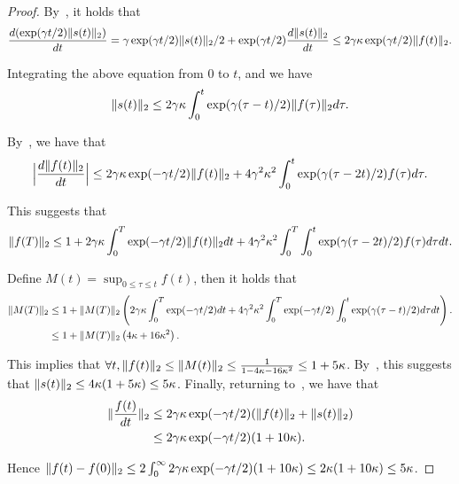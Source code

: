 \begin{proof}
By~, it holds that
\begin{align*}
    \frac{d (\exp(\gamma t /2)\| s(t)\|_2)}{dt} = \gamma \exp(\gamma t / 2) \| s(t)\|_2 / 2 + \exp(\gamma t / 2) \frac{d \| s(t)\|_2}{dt} \le 2\gamma \kappa  \exp(\gamma t / 2) \| f(t) \|_2.
\end{align*}

Integrating the above equation from $0$ to $t$, and we have 
\begin{align}
\label{eq:connectsf}
    \| s(t) \|_2 \le 2\gamma \kappa \int_{0}^{t}  \exp(\gamma (\tau - t) / 2) \| f(\tau) \|_2 d \tau.
\end{align}

By~, we have that
\begin{align*}
     \Big | \frac{d\| f(t) \|_2}{dt} \Big |   \le 2 \gamma \kappa  \exp(-\gamma t /2)  \|f(t)\|_2 +  4\gamma^2 \kappa^2 \int_{0}^{t}  \exp(\gamma (\tau - 2t)/ 2) f(\tau) d \tau.
\end{align*}

This suggests that
\begin{align*}
    \|f(T)\|_2 \le 1 + 2 \gamma \kappa \int_{0}^T  \exp(-\gamma t /2)  \|f(t)\|_2 dt  +  4\gamma^2 \kappa^2 \int_{0}^T \int_{0}^{t}  \exp(\gamma (\tau - 2t) / 2) f(\tau) d \tau dt.
\end{align*}

Define $M(t) = \sup_{0 \le \tau \le t} f(t)$, then it holds that
\begin{align*}
    \| M(T) \|_2 &\le 1 + \| M(T) \|_2 \left(2 \gamma \kappa \int_{0}^T  \exp(-\gamma t /2) dt +  4\gamma^2 \kappa^2 \int_{0}^T \exp(-\gamma t/2)  \int_{0}^{t}  \exp(\gamma  (\tau - t)/ 2)  d \tau dt \right). \\
    &\le 1 +  \| M(T) \|_2 \left( 4 \kappa + 16 \kappa^2 \right).
\end{align*}

This implies that $\forall t, \|f(t)\|_2 \le \| M(t) \|_2 \le \frac{1}{ 1- 4 \kappa - 16 \kappa^2} \le 1 + 5 \kappa$. By~, this suggests that $\| s(t)\|_2 \le 4 \kappa ( 1 + 5 \kappa) \le 5 \kappa$. Finally, returning to~, we have that
\begin{align*}
     \| \frac{f(t)}{dt} \|_2 &\le  2 \gamma \kappa  \exp(-\gamma t /2)  (\|f(t)\|_2 + \| s(t)\|_2) \\
     &\le  2 \gamma \kappa  \exp(-\gamma t /2)  (1 + 10 \kappa).
\end{align*}

Hence $\| f(t) - f(0)\|_2 \le 2 \int_{0}^{\infty} 2 \gamma \kappa  \exp(-\gamma t /2)  (1 + 10 \kappa)\le 2 \kappa (1 + 10 \kappa) \le 5 \kappa$.


\end{proof}
